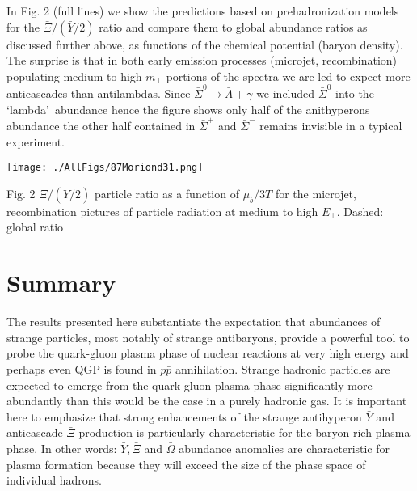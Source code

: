 \begin{mdframed}[linecolor=gray,roundcorner=12pt,backgroundcolor=Dandelion!15,linewidth=1pt,leftmargin=0cm,rightmargin=0cm,topline=true,bottomline=true,skipabove=12pt]
In Fig. 2 (full lines) we show the predictions based on prehadronization models for the  $\bar \Xi/(\bar Y/2)$ ratio and compare them to global abundance ratios as discussed further above, as functions of the chemical potential (baryon density). The surprise is that in both early emission processes (microjet, recombination) populating medium to high $m_\perp$ portions of the spectra we are led to expect more anticascades than antilambdas. Since  $\bar \Sigma^0 \rightarrow \bar \Lambda +\gamma$ we included $\bar \Sigma^0$ into the \lq lambda\rq\ abundance hence the figure shows only half of the anithyperons abundance  the other half contained in $\bar \Sigma^+$ and $\bar \Sigma^-$ remains invisible in a typical experiment.

\centerline{\texttt{[image: ./AllFigs/87Moriond31.png]}}%
\noindent\small{Fig. 2 $\bar \Xi /(\bar Y /2)$ particle ratio as a function of 
$\mu_b/3T$ for the microjet, recombination pictures of particle radiation at medium to high $E_\perp$. Dashed: global ratio}

\section*{Summary}

The results presented here substantiate the expectation that abundances of strange particles, most notably of strange antibaryons, provide a powerful tool to probe the quark-gluon plasma phase of nuclear reactions at very high energy and perhaps even QGP is found in $p \bar p$ annihilation. Strange hadronic particles are expected to emerge from the quark-gluon plasma phase significantly more abundantly than this would be the case in a purely hadronic gas. It is important here to emphasize that strong enhancements of the strange antihyperon $\bar Y$ and anticascade $\bar \Xi$ production is particularly characteristic for the baryon rich plasma phase. In other words: $\bar Y, \bar \Xi$ and $\bar \Omega$ abundance anomalies are characteristic for plasma formation because they will exceed the size of the phase space of individual hadrons.


\end{mdframed}
